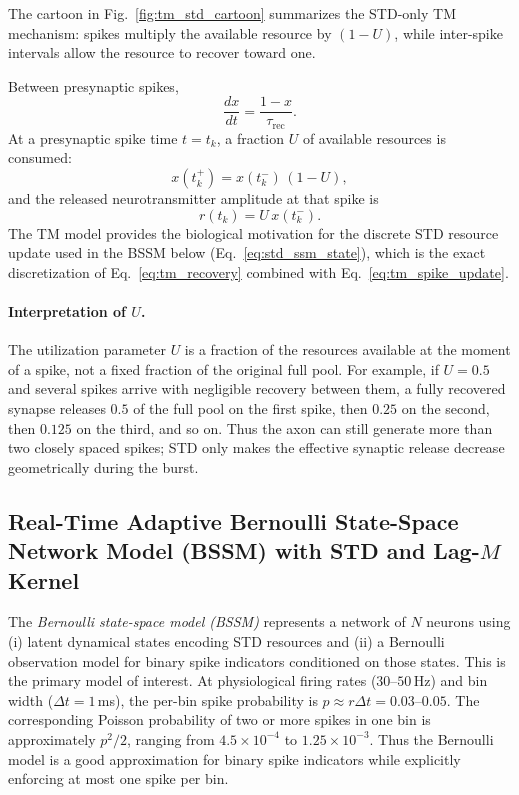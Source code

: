 \documentclass[11pt]{article}
\begin{document}
\noindent
The cartoon in Fig.~\ref{fig:tm_std_cartoon} summarizes the STD-only TM mechanism:
spikes multiply the available resource by $(1-U)$, while inter-spike intervals allow
the resource to recover toward one.

\noindent
Between presynaptic spikes,
\begin{equation}
\frac{dx}{dt}=\frac{1-x}{\tau_{\mathrm{rec}}}.
\label{eq:tm_recovery}
\end{equation}
At a presynaptic spike time $t=t_k$, a fraction $U$ of available resources is consumed:
\begin{equation}
x(t_k^+)=x(t_k^-)\,(1-U),
\label{eq:tm_spike_update}
\end{equation}
and the released neurotransmitter amplitude at that spike is
\begin{equation}
r(t_k)=U\,x(t_k^-).
\label{eq:tm_release}
\end{equation}
The TM model provides the biological motivation for the discrete STD resource update
used in the BSSM below (Eq.~\ref{eq:std_ssm_state}), which is the exact discretization
of Eq.~\eqref{eq:tm_recovery} combined with Eq.~\eqref{eq:tm_spike_update}.

\paragraph{Interpretation of $U$.}
The utilization parameter $U$ is a fraction of the resources available at the
moment of a spike, not a fixed fraction of the original full pool. For example,
if $U=0.5$ and several spikes arrive with negligible recovery between them, a
fully recovered synapse releases $0.5$ of the full pool on the first spike,
then $0.25$ on the second, then $0.125$ on the third, and so on. Thus the axon
can still generate more than two closely spaced spikes; STD only makes the
effective synaptic release decrease geometrically during the burst.

\subsection{Real-Time Adaptive Bernoulli State-Space Network Model (BSSM) with STD
            and Lag-$M$ Kernel}
\label{sec:bssm_std}

The \emph{Bernoulli state-space model (BSSM)} represents a network of $N$ neurons using
(i) latent dynamical states encoding STD resources and (ii) a Bernoulli observation model
for binary spike indicators conditioned on those states. This is the primary model of
interest. At physiological firing rates ($30$--$50$\,Hz) and bin width
($\Delta t = 1$\,ms), the per-bin spike probability is
$p \approx r\Delta t = 0.03$--$0.05$. The corresponding Poisson probability
of two or more spikes in one bin is approximately $p^2/2$, ranging from
$4.5\times10^{-4}$ to $1.25\times10^{-3}$. Thus the Bernoulli model is a good
approximation for binary spike indicators while explicitly enforcing at most one
spike per bin.
\end{document}
